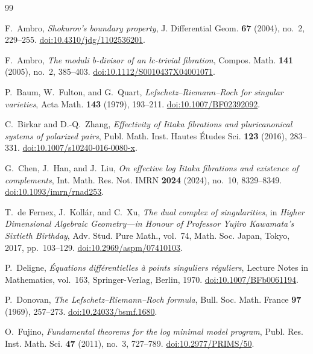 \begin{thebibliography}{99}
\raggedright

F.~Ambro, \emph{Shokurov's boundary property},
J. Differential Geom. \textbf{67} (2004), no.~2, 229--255.
\href{https://doi.org/10.4310/jdg/1102536201}{doi:10.4310/jdg/1102536201}.

F.~Ambro, \emph{The moduli b-divisor of an lc-trivial fibration},
Compos. Math. \textbf{141} (2005), no.~2, 385--403.
\href{https://doi.org/10.1112/S0010437X04001071}{doi:10.1112/S0010437X04001071}.

P.~Baum, W.~Fulton, and G.~Quart,
\emph{Lefschetz--Riemann--Roch for singular varieties},
Acta Math. \textbf{143} (1979), 193--211.
\href{https://doi.org/10.1007/BF02392092}{doi:10.1007/BF02392092}.

C.~Birkar and D.-Q.~Zhang,
\emph{Effectivity of Iitaka fibrations and pluricanonical systems of polarized pairs},
Publ. Math. Inst. Hautes \'Etudes Sci. \textbf{123} (2016), 283--331.
\href{https://doi.org/10.1007/s10240-016-0080-x}{doi:10.1007/s10240-016-0080-x}.

G.~Chen, J.~Han, and J.~Liu,
\emph{On effective log Iitaka fibrations and existence of complements},
Int. Math. Res. Not. IMRN \textbf{2024} (2024), no.~10, 8329--8349.
\href{https://doi.org/10.1093/imrn/rnad253}{doi:10.1093/imrn/rnad253}.

T.~de Fernex, J.~Koll\'ar, and C.~Xu,
\emph{The dual complex of singularities},
in \emph{Higher Dimensional Algebraic Geometry---in Honour of Professor
Yujiro Kawamata's Sixtieth Birthday},
Adv. Stud. Pure Math., vol.~74, Math. Soc. Japan, Tokyo, 2017, pp.~103--129.
\href{https://doi.org/10.2969/aspm/07410103}{doi:10.2969/aspm/07410103}.

P.~Deligne, \emph{\'Equations diff\'erentielles \`a points singuliers r\'eguliers},
Lecture Notes in Mathematics, vol.~163, Springer-Verlag, Berlin, 1970.
\href{https://doi.org/10.1007/BFb0061194}{doi:10.1007/BFb0061194}.

P.~Donovan, \emph{The Lefschetz--Riemann--Roch formula},
Bull. Soc. Math. France \textbf{97} (1969), 257--273.
\href{https://doi.org/10.24033/bsmf.1680}{doi:10.24033/bsmf.1680}.

O.~Fujino, \emph{Fundamental theorems for the log minimal model program},
Publ. Res. Inst. Math. Sci. \textbf{47} (2011), no.~3, 727--789.
\href{https://doi.org/10.2977/PRIMS/50}{doi:10.2977/PRIMS/50}.


\end{thebibliography}
